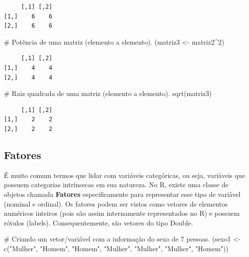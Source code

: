 \documentclass[
  letterpaper,
  DIV=11,
  numbers=noendperiod]{scrreprt}
\newenvironment{Shaded}{\begin{snugshade}}{\end{snugshade}}
\newcommand{\CommentTok}[1]{\textcolor[rgb]{0.37,0.37,0.37}{#1}}
\newcommand{\DecValTok}[1]{\textcolor[rgb]{0.68,0.00,0.00}{#1}}
\newcommand{\FunctionTok}[1]{\textcolor[rgb]{0.28,0.35,0.67}{#1}}
\newcommand{\NormalTok}[1]{\textcolor[rgb]{0.00,0.23,0.31}{#1}}
\newcommand{\OtherTok}[1]{\textcolor[rgb]{0.00,0.23,0.31}{#1}}
\newcommand{\SpecialCharTok}[1]{\textcolor[rgb]{0.37,0.37,0.37}{#1}}
\newcommand{\StringTok}[1]{\textcolor[rgb]{0.13,0.47,0.30}{#1}}
\begin{document}
\begin{verbatim}
     [,1] [,2]
[1,]    6    6
[2,]    6    6
\end{verbatim}

\begin{Shaded}
\begin{Highlighting}[]
\CommentTok{\# Potência de uma matriz (elemento a elemento).}
\NormalTok{(matriz3 }\OtherTok{\textless{}{-}}\NormalTok{ matriz2}\SpecialCharTok{\^{}}\DecValTok{2}\NormalTok{)}
\end{Highlighting}
\end{Shaded}

\begin{verbatim}
     [,1] [,2]
[1,]    4    4
[2,]    4    4
\end{verbatim}

\begin{Shaded}
\begin{Highlighting}[]
\CommentTok{\# Raiz quadrada de uma matriz (elemento a elemento).}
\FunctionTok{sqrt}\NormalTok{(matriz3)}
\end{Highlighting}
\end{Shaded}

\begin{verbatim}
     [,1] [,2]
[1,]    2    2
[2,]    2    2
\end{verbatim}

\hypertarget{fatores}{%
\subsection{Fatores}\label{fatores}}

É muito comum termos que lidar com variáveis categóricas, ou seja,
variáveis que possuem categorias intrínsecas em sua natureza. No R,
existe uma classe de objetos chamada \textbf{Fatores} especificamente
para representar esse tipo de variável (nominal e ordinal). Os fatores
podem ser vistos como vetores de elementos numéricos inteiros (pois são
assim internamente representados no R) e possuem rótulos (labels).
Consequentemente, são vetores do tipo Double.

\begin{Shaded}
\begin{Highlighting}[]
\CommentTok{\# Criando um vetor/variável com a informação do sexo de 7 pessoas. }
\NormalTok{(sexo1 }\OtherTok{\textless{}{-}} \FunctionTok{c}\NormalTok{(}\StringTok{"Mulher"}\NormalTok{, }\StringTok{"Homem"}\NormalTok{, }\StringTok{"Homem"}\NormalTok{, }\StringTok{"Mulher"}\NormalTok{, }\StringTok{"Mulher"}\NormalTok{, }\StringTok{"Mulher"}\NormalTok{, }\StringTok{"Homem"}\NormalTok{))}
\end{Highlighting}
\end{Shaded}
\end{document}
